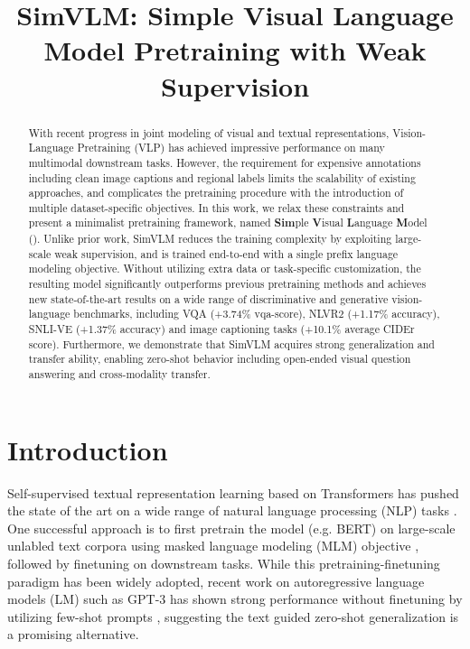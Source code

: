 \title{{SimVLM}: Simple Visual Language Model Pretraining with Weak Supervision}

\begin{abstract}
With recent progress in joint modeling of visual and textual representations, Vision-Language Pretraining (VLP) has achieved impressive performance on many multimodal downstream tasks. However, the requirement for expensive annotations including clean image captions and regional labels limits the scalability of existing approaches, and complicates the pretraining procedure with the introduction of multiple dataset-specific objectives. In this work, we relax these constraints and present a minimalist pretraining framework, named \textbf{Sim}ple \textbf{V}isual \textbf{L}anguage \textbf{M}odel ({\bfSimVLM}).
Unlike prior work, {SimVLM} reduces the training complexity by exploiting large-scale weak supervision, and is trained end-to-end with a single prefix language modeling objective. Without utilizing extra data or task-specific customization, the resulting model significantly outperforms previous pretraining methods and achieves new state-of-the-art results on a wide range of discriminative and generative vision-language benchmarks, including VQA (+3.74\% vqa-score), NLVR2 (+1.17\% accuracy), SNLI-VE (+1.37\% accuracy) and image captioning tasks (+10.1\% average CIDEr score). Furthermore, we demonstrate that {SimVLM} acquires strong generalization and transfer ability, enabling zero-shot behavior including open-ended visual question answering and cross-modality transfer.
\end{abstract}

\section{Introduction}\label{sec:intro}

Self-supervised textual representation learning \citep{devlin2018bert,radford2018improving,radford2019language,liu2019roberta,yang2019xlnet,raffel2019exploring,brown2020language} based on Transformers \citep{vaswani2017attention} has pushed the state of the art on a wide range of natural language processing (NLP) tasks \citep{rajpurkar2016squad,wang2018glue,sarlin2020superglue}. One successful approach is to first pretrain the model (e.g. BERT) on large-scale unlabled text corpora using masked language modeling (MLM) objective  \citep{devlin2018bert}, followed by finetuning on downstream tasks. While this pretraining-finetuning paradigm has been widely adopted, recent work on autoregressive language models (LM) \citep{radford2019language,brown2020language} such as GPT-3 has shown strong performance without finetuning by utilizing few-shot prompts \citep{liu2021pretrain}, suggesting the text guided zero-shot generalization is a promising alternative.

